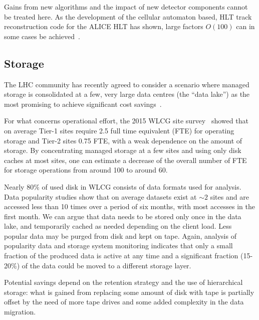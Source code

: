 Gains from new algorithms and the impact of new detector components
cannot be treated here. As the development of the cellular automaton
based, HLT track reconstruction code for the ALICE HLT has shown,
large factors $O(100)$ can in some cases be achieved~\cite{rohr}.

\subsection{Storage}
The LHC community has recently agreed to consider a scenario where
managed storage is consolidated at a few, very large data centres (the
``data lake'') as the most promising to achieve significant cost
savings~\cite{cwp}.

For what concerns operational effort, the 2015 WLCG site
survey~\cite{survey} showed that on average Tier-1 sites require 2.5
full time equivalent (FTE) for operating storage and \mbox{Tier-2} sites 0.75 FTE, with a weak
dependence on the amount of storage. By concentrating managed storage
at a few sites and using only disk caches at
most sites, one can estimate a decrease of the overall number of FTE
for storage operations from around 100 to around 60.

Nearly $80\%$ of used disk in WLCG consists of data formats used for
analysis. Data popularity studies show that on average datasets exist
at $\sim2$ sites and are accessed less than 10 times over a period of
six months, with most accesses in the first month.  We can argue that
data needs to be stored only once in the data lake, and temporarily
cached as needed depending on the client load. Less popular data may
be purged from disk and kept on tape.
Again, analysis of popularity data and storage system monitoring
indicates that only a small fraction of the produced data is active at
any time and a significant fraction (15-20\%) of the data could be
moved to a different storage layer.

Potential savings depend on the retention strategy and the use of
hierarchical storage: what is gained from replacing some amount of
disk with tape is partially offset by the need of more tape drives and
some added complexity in the data migration.

